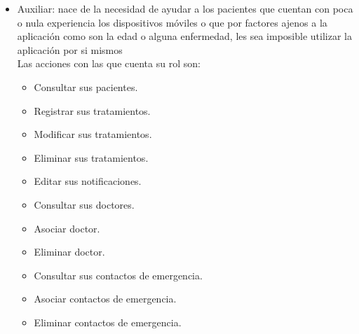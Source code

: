 \begin{itemize}
	\item Auxiliar: nace de la necesidad de ayudar a los pacientes que cuentan con poca o nula experiencia los dispositivos móviles o que por factores ajenos a la aplicación como son la edad o alguna enfermedad, les sea imposible utilizar la aplicación por si mismos\\
	Las acciones con las que cuenta su rol son:
	\begin{itemize}
		\item Consultar sus pacientes.
		\item Registrar sus tratamientos.
		\item Modificar sus tratamientos.
		\item Eliminar sus tratamientos.
		\item Editar sus notificaciones.
		\item Consultar sus doctores.
		\item Asociar doctor.
		\item Eliminar doctor.
		\item Consultar sus contactos de emergencia.
		\item Asociar contactos de emergencia.
		\item Eliminar contactos de emergencia.
%		
	\end{itemize}
\end{itemize}


